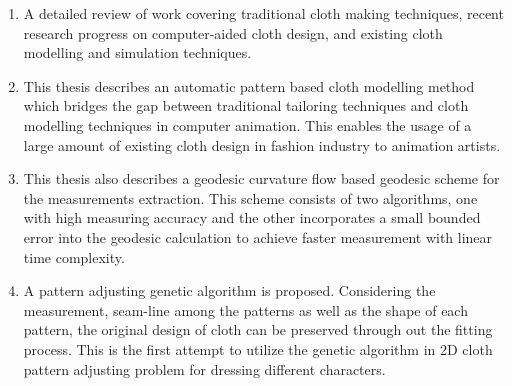 \begin{enumerate}
	\item A detailed review of work covering traditional cloth making techniques, recent research progress on computer-aided cloth design, and existing cloth modelling and simulation techniques. 

	\item This thesis describes an automatic pattern based cloth modelling method which bridges the gap between traditional tailoring techniques and cloth modelling techniques in computer animation. This enables the usage of a large amount of existing cloth design in fashion industry to animation artists.
	
	\item This thesis also describes a geodesic curvature flow based geodesic scheme for the measurements extraction. This scheme consists of two algorithms, one with high measuring accuracy and the other incorporates a small bounded error into the geodesic calculation to achieve faster measurement with linear time complexity. 
	
	\item A pattern adjusting genetic algorithm is proposed. Considering the measurement, seam-line among the patterns as well as the shape of each pattern, the original design of cloth can be preserved through out the fitting process. This is the first attempt to utilize the genetic algorithm in 2D cloth pattern adjusting problem for dressing different characters.
	
	

\end{enumerate}






